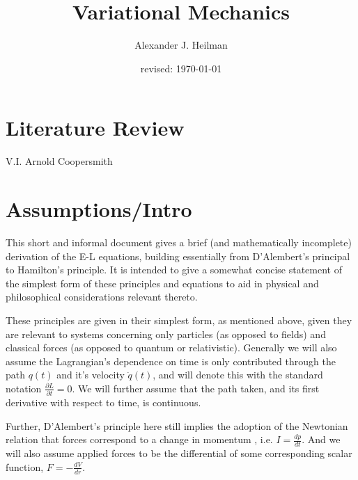 \documentclass{article}\usepackage[]{graphicx}\usepackage[]{color}
\title{Variational Mechanics}%
\author{Alexander J. Heilman}%
\date{revised: \today}%
\begin{document}
\maketitle


\tableofcontents

\pagebreak

\section*{Literature Review}

V.I. Arnold
Coopersmith


\section{Assumptions/Intro}

This short and informal document gives a brief (and mathematically incomplete) derivation of the E-L equations, building essentially from D'Alembert's principal to Hamilton's principle. It is intended to give a somewhat concise statement of the simplest form of these principles and equations to aid in physical and philosophical considerations relevant thereto.

These principles are given in their simplest form, as mentioned above, given they are relevant to systems concerning only particles (as opposed to fields) and classical forces (as opposed to quantum or relativistic). Generally we will also assume the Lagrangian's dependence on time is only contributed through the path $q(t)$ and it's velocity $\dot{q}(t)$, and will denote this with the standard notation $\frac{\partial L}{\partial t}=0$. We will further assume that the path taken, and its first derivative with respect to time, is continuous. 

Further, D'Alembert's principle here still implies the adoption of the Newtonian relation that forces correspond to a change in momentum , i.e. $I=\frac{dp}{dt}$. And we will also assume applied forces to be the differential of some corresponding scalar function, $F=-\frac{dV}{dr}$.




\end{document}
